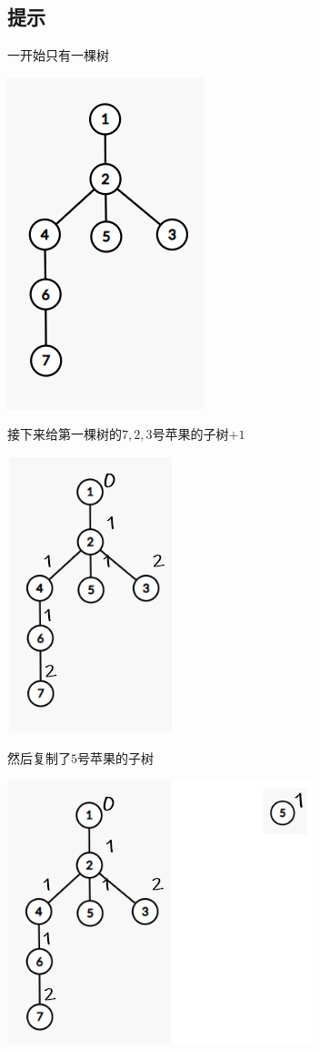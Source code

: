 \documentclass[12pt]{article}
\begin{document}
    \subsection{提示}
    一开始只有一棵树\par
    \centerline{\includegraphics{hint1.png}}\par
    接下来给第一棵树的$7,2,3$号苹果的子树$+1$\par
    \centerline{\includegraphics{hint2.png}}\par
    然后复制了$5$号苹果的子树\par
    \centerline{\includegraphics{hint3.png}}\par
\end{document}
